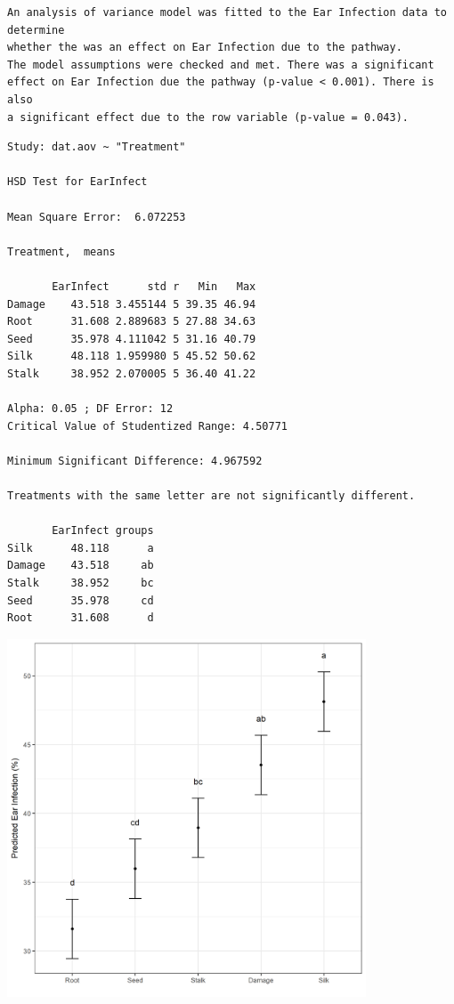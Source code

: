 \documentclass[a4paper, 10pt, fleqn, twosided]{memoir}
\begin{document}
\begin{tcolorbox}[title = Exercise 5 interpretation]
\begin{verbatim}
An analysis of variance model was fitted to the Ear Infection data to determine
whether the was an effect on Ear Infection due to the pathway.
The model assumptions were checked and met. There was a significant
effect on Ear Infection due the pathway (p-value < 0.001). There is also
a significant effect due to the row variable (p-value = 0.043).
\end{verbatim}
\end{tcolorbox}

\begin{tcolorbox}[title = Exercise 5 output continued]
\begin{verbatim}
Study: dat.aov ~ "Treatment"

HSD Test for EarInfect

Mean Square Error:  6.072253

Treatment,  means

       EarInfect      std r   Min   Max
Damage    43.518 3.455144 5 39.35 46.94
Root      31.608 2.889683 5 27.88 34.63
Seed      35.978 4.111042 5 31.16 40.79
Silk      48.118 1.959980 5 45.52 50.62
Stalk     38.952 2.070005 5 36.40 41.22

Alpha: 0.05 ; DF Error: 12
Critical Value of Studentized Range: 4.50771

Minimum Significant Difference: 4.967592

Treatments with the same letter are not significantly different.

       EarInfect groups
Silk      48.118      a
Damage    43.518     ab
Stalk     38.952     bc
Seed      35.978     cd
Root      31.608      d
\end{verbatim}
\end{tcolorbox}

\begin{tcolorbox}[title = Exercise 5 output continued]
\includegraphics[width=0.8\textwidth, frame]{Exercise5Pred.png}

\end{tcolorbox}
\end{document}

